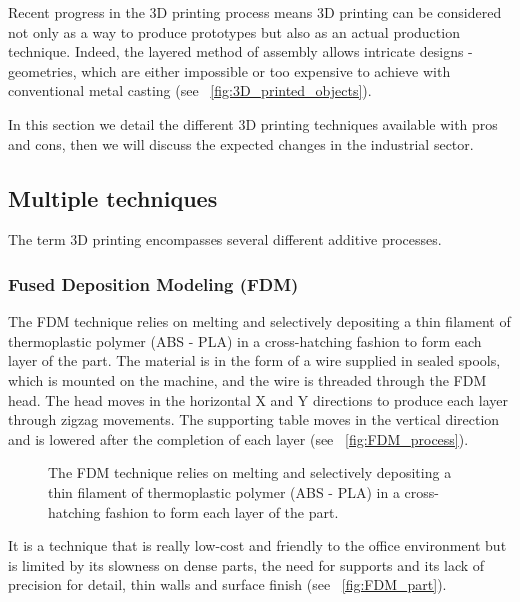 Recent progress in the 3D printing process means 3D printing can be considered not only as a way to produce prototypes but also as an actual production technique. Indeed, the layered method of assembly allows intricate designs - geometries, which are either impossible or too expensive to achieve with conventional metal casting (see \figurename~\ref{fig:3D_printed_objects}).



In this section we detail the different 3D printing techniques available with pros and cons, then we will discuss the expected changes in the industrial sector.

\subsection{Multiple techniques} %

The term 3D printing encompasses several different additive processes.

\subsubsection{Fused Deposition Modeling (FDM)} %

The FDM technique relies on melting and selectively depositing a thin filament of thermoplastic polymer (ABS - PLA) in a cross-hatching fashion to form each layer of the part. The material is in the form of a wire supplied in sealed spools, which is mounted on the machine, and the wire is threaded through the FDM head. The head moves in the horizontal X and Y directions to produce each layer through zigzag movements. The supporting table moves in the vertical direction and is lowered after the completion of each layer (see \figurename~\ref{fig:FDM_process}).

\begin{figure}[tb]
    \centering
        \hfil
        \hfil
    \caption{The FDM technique relies on melting and selectively depositing a thin filament of thermoplastic polymer (ABS - PLA) in a cross-hatching fashion to form each layer of the part.}
    \label{fig:FDM_technique}
\end{figure}

It is a technique that is really low-cost and friendly to the office environment but is limited by its slowness on dense parts, the need for supports and its lack of precision for detail, thin walls and surface finish (see \figurename~\ref{fig:FDM_part}).


